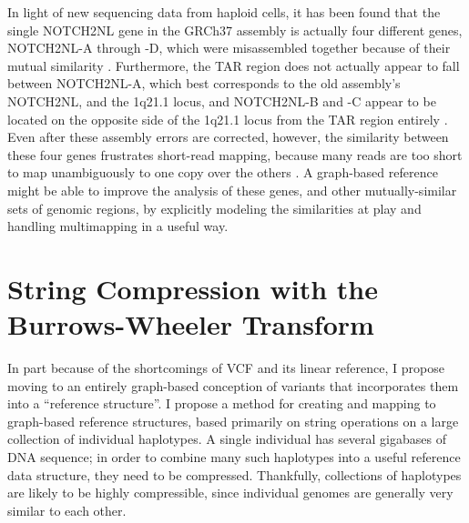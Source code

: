 \documentclass[11pt,proposal]{ucthesis}
\begin{document}
In light of new sequencing data from haploid cells, it has been found that the single NOTCH2NL gene in the GRCh37 assembly is actually four different genes, NOTCH2NL-A through -D, which were misassembled together because of their mutual similarity \cite{jacobs2014recently}. Furthermore, the TAR region does not actually appear to fall between NOTCH2NL-A, which best corresponds to the old assembly's NOTCH2NL, and the 1q21.1 locus, and NOTCH2NL-B and -C appear to be located on the opposite side of the 1q21.1 locus from the TAR region entirely \cite{jacobs2014recently}. Even after these assembly errors are corrected, however, the similarity between these four genes frustrates short-read mapping, because many reads are too short to map unambiguously to one copy over the others \cite{jacobs2014recently}. A graph-based reference might be able to improve the analysis of these genes, and other mutually-similar sets of genomic regions, by explicitly modeling the similarities at play and handling multimapping in a useful way.
    
    
    
    
    
    

\section{String Compression with the Burrows-Wheeler Transform}
\label{sec:bwt}

In part because of the shortcomings of VCF and its linear reference, I propose moving to an entirely graph-based conception of variants that incorporates them into a ``reference structure''. I propose a method for creating and mapping to graph-based reference structures, based primarily on string operations on a large collection of individual haplotypes. A single individual has several gigabases of DNA sequence; in order to combine many such haplotypes into a useful reference data structure, they need to be compressed. Thankfully, collections of haplotypes are likely to be highly compressible, since individual genomes are generally very similar to each other.
\end{document}
